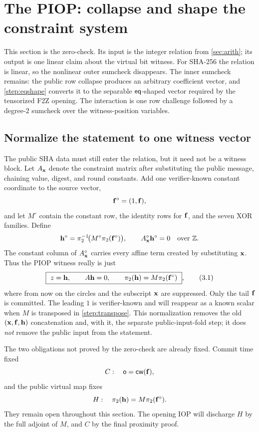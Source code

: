 \section{The PIOP: collapse and shape the constraint system}\label{sec:piop}

This section is the zero-check.  Its input is the integer relation from
\cref{sec:arith}; its output is one linear claim about the virtual bit witness.
For SHA-256 the relation is linear, so the nonlinear outer sumcheck disappears.
The inner sumcheck remains: the public row collapse produces an arbitrary
coefficient vector, and \cref{step:eqshape} converts it to the separable
$\mathsf{eq}$-shaped vector required by the tensorized F2Z opening.  The interaction is
one row challenge followed by a degree-$2$ sumcheck over the witness-position
variables.

\subsection{Normalize the statement to one witness vector}

The public SHA data must still enter the relation, but it need not be a witness
block.  Let $A_{\mathbf{x}}$ denote the constraint matrix after substituting the public
message, chaining value, digest, and round constants.  Add one verifier-known
constant coordinate to the source vector,
\[
  \mathbf{f}^{\circ}=(1,\mathbf{f}),
\]
and let $M^{\circ}$ contain the constant row, the identity rows for $\mathbf{f}$, and
the seven XOR families.  Define
\[
  \mathbf{h}^{\circ}
  =\pi_2^{-1}\!\bigl(M^{\circ}\pi_2(\mathbf{f}^{\circ})\bigr),
  \qquad
  A_{\mathbf{x}}^{\circ}\mathbf{h}^{\circ}=0\quad\text{over }\mathbb{Z} .
\]
The constant column of $A_{\mathbf{x}}^{\circ}$ carries every affine term created by
substituting $\mathbf{x}$.  Thus the PIOP witness really is just
\[
  \boxed{\ z=\hh,\qquad A\hh=0,\qquad
  \pitwo(\hh)=M\pitwo(\ff^{\circ})\ },                 \tag{3.1}
\]
where from now on the circles and the subscript $\mathbf{x}$ are suppressed.  Only the
tail $\mathbf{f}$ is committed.  The leading $1$ is verifier-known and will reappear as
a known scalar when $M$ is transposed in \cref{step:transpose}.  This
normalization removes the old $(\mathbf{x},\mathbf{f},\mathbf{h})$ concatenation and, with it, the
separate public-input-fold step; it does \emph{not} remove the public input from
the statement.

The two obligations not proved by the zero-check are already fixed.  Commit
time fixed
\[
  C:\quad \mathsf{o}=\mathsf{cw}(\mathbf{f}),
\]
and the public virtual map fixes
\[
  H:\quad \pi_2(\mathbf{h})=M\pi_2(\mathbf{f}^{\circ}).
\]
They remain open throughout this section.  The opening IOP will discharge $H$
by the full adjoint of $M$, and $C$ by the final proximity proof.

